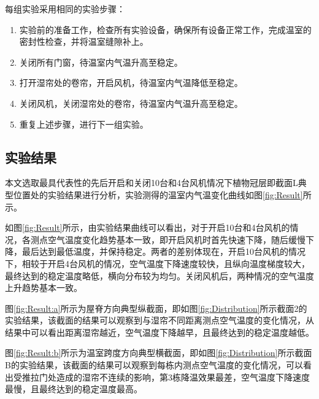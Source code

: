 每组实验采用相同的实验步骤：
	\begin{enumerate}
		\item 实验前的准备工作，检查所有实验设备，确保所有设备正常工作，完成温室的密封性检查，并将温室缝隙补上。
		\item 关闭所有门窗，待温室内气温升高至稳定。
		\item 打开湿帘处的卷帘，开启风机，待温室内气温降低至稳定。
		\item 关闭风机，关闭湿帘处的卷帘，待温室内气温升高至稳定。
		\item 重复上述步骤，进行下一组实验。
	\end{enumerate}
	
	\subsection{实验结果}
	本文选取最具代表性的先后开启和关闭10台和4台风机情况下植物冠层即截面L典型位置处的实验结果进行分析，实验测得的温室内气温变化曲线如图\ref{fig:Result}所示。
	
	\begin{figure}[!htbp]
		\centering
 	\end{figure}
如图\ref{fig:Result}所示，由实验结果曲线可以看出，对于开启10台和4台风机的情况，各测点空气温度变化趋势基本一致，即开启风机时首先快速下降，随后缓慢下降，最后达到最低温度，并保持稳定。两者的差别体现在，开启10台风机的情况下，相较于开启4台风机的情况，空气温度下降速度较快，且纵向温度梯度较大，最终达到的稳定温度略低，横向分布较为均匀。关闭风机后，两种情况的空气温度上升趋势基本一致。
	
图\ref{fig:Result:a}所示为屋脊方向典型纵截面，即如图\ref{fig:Distribution}所示截面2的实验结果，该截面的结果可以观察到与湿帘不同距离测点空气温度的变化情况，从结果中可以看出距离湿帘越近，空气温度下降越早，且最终达到的稳定温度越低。

图\ref{fig:Result:b}所示为温室跨度方向典型横截面，即如图\ref{fig:Distribution}所示截面B的实验结果，该截面的结果可以观察到每栋内测点空气温度的变化情况，可以看出受推拉门处造成的湿帘不连续的影响，第3栋降温效果最差，空气温度下降速度最慢，且最终达到的稳定温度最高。

